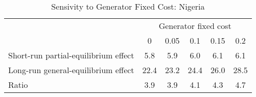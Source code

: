 \begin{table}[H] 
\center 
\singlespace 
\caption{Sensivity to Generator Fixed Cost: Nigeria} \label{generator_fixed_cost}
\vspace{-.1in} 
\begin{tabular}{l c c c c c}\hline 
 & \multicolumn{5}{c}{Generator fixed cost} \\ 
\cline{2-6} 
  & 0 & 0.05 & 0.1 & 0.15 & 0.2    \\ 
\hline 
Short-run partial-equilibrium effect &      5.8 &      5.9 &      6.0  &      6.1 &      6.1  \\  Long-run general-equilibrium effect &     22.4 &     23.2 &     24.4  &     26.0 &     28.5  \\  Ratio &      3.9 &      3.9 &      4.1  &      4.3 &      4.7  \\  \hline 
\end{tabular}
\end{table} 
